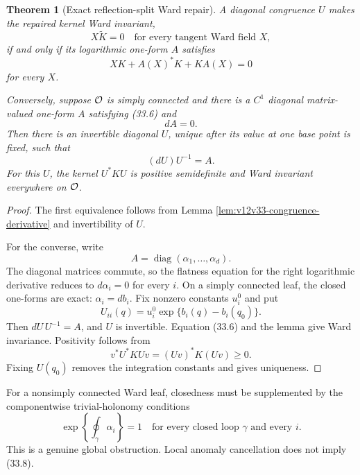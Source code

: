 \documentclass[11pt]{article}
\newtheorem{theorem}{Theorem}[section]
\theoremstyle{remark}
\begin{document}
\begin{theorem}[Exact reflection-split Ward repair]
\label{thm:v12v33-exact-repair}
A diagonal congruence \(U\) makes the repaired kernel Ward invariant,
\begin{equation}
                         X\widetilde K=0
 \quad\text{for every tangent Ward field }X,      \tag{33.5}
\end{equation}
if and only if its logarithmic one-form \(A\) satisfies
\begin{equation}
 XK+A(X)^*K+KA(X)=0                              \tag{33.6}
 \label{eq:v12v33-congruence-equation}
\end{equation}
for every \(X\).

Conversely, suppose \({\cal O}\) is simply connected and there is a
\(C^1\) diagonal matrix-valued one-form \(A\) satisfying (33.6) and
\begin{equation}
                         dA=0.                   \tag{33.7}
\end{equation}
Then there is an invertible diagonal \(U\), unique after its value at
one base point is fixed, such that
\[
 (dU)U^{-1}=A.
\]
For this \(U\), the kernel \(U^*KU\) is positive semidefinite and
Ward invariant everywhere on \({\cal O}\).
\end{theorem}

\begin{proof}
The first equivalence follows from Lemma
\ref{lem:v12v33-congruence-derivative} and invertibility of \(U\).

For the converse, write
\[
 A=\operatorname{diag}(\alpha_1,\ldots,\alpha_d).
\]
The diagonal matrices commute, so the flatness equation for the
right logarithmic derivative reduces to \(d\alpha_i=0\) for every
\(i\).  On a simply connected leaf, the closed one-forms are exact:
\(\alpha_i=db_i\).  Fix nonzero constants \(u_i^0\) and put
\[
 U_{ii}(q)=u_i^0\exp\{b_i(q)-b_i(q_0)\}.
\]
Then \(dU\,U^{-1}=A\), and \(U\) is invertible.  Equation (33.6) and
the lemma give Ward invariance.  Positivity follows from
\[
 v^*U^*KUv=(Uv)^*K(Uv)\geq0.
\]
Fixing \(U(q_0)\) removes the integration constants and gives
uniqueness.
\end{proof}

For a nonsimply connected Ward leaf, closedness must be supplemented
by the componentwise trivial-holonomy conditions
\begin{equation}
 \exp\left\{\oint_\gamma\alpha_i\right\}=1
 \quad\text{for every closed loop \(\gamma\) and every \(i\)}.
                                                        \tag{33.8}
\end{equation}
This is a genuine global obstruction.  Local anomaly cancellation
does not imply (33.8).
\end{document}
